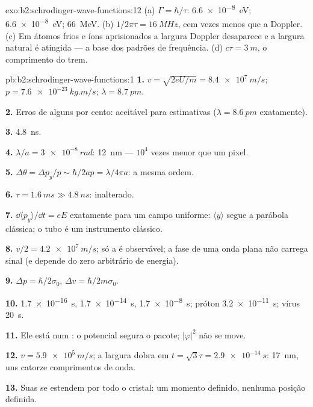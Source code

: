 \begin{solution}{exo:b2:schrodinger-wave-functions:12}
(a) $\Gamma = \hbar/\tau$: \qty{6.6e-8}{eV}; \qty{6.6e-8}{eV}; \qty{66}{MeV}. (b)
$1/2\pi\tau = \qty{16}{MHz}$, cem vezes menos que a Doppler. (c) Em
átomos frios e íons aprisionados a largura Doppler desaparece e a largura
natural é atingida --- a base dos padrões de frequência. (d) $c\tau =
\qty{3}{m}$, o comprimento do trem.
\end{solution}

\begin{solution}{pb:b2:schrodinger-wave-functions:1}
\textbf{1.} $v = \sqrt{2eU/m} = \qty{8.4e7}{m/s}$; $p = \qty{7.6e-23}{kg.m/s}$; $\lambda =
\qty{8.7}{pm}$.

\textbf{2.} Erros de alguns por cento: aceitável para estimativas ($\lambda =
\qty{8.6}{pm}$ exatamente).

\textbf{3.} \qty{4.8}{ns}.

\textbf{4.} $\lambda/a = \qty{3e-8}{rad}$: \qty{12}{nm} --- $10^4$ vezes menor que um
pixel.

\textbf{5.} $\Delta\theta = \Delta p_y/p \sim \hbar/2ap = \lambda/4\pi a$: a mesma ordem.

\textbf{6.} $\tau = \qty{1.6}{ms} \gg \qty{4.8}{ns}$: inalterado.

\textbf{7.} $\dd\langle p_y\rangle/\dd t = eE$ exatamente para um campo uniforme:
$\langle y\rangle$ segue a parábola clássica; o tubo é um
instrumento clássico.

\textbf{8.} $v/2 = \qty{4.2e7}{m/s}$; só a  é observável;
a fase de uma onda plana não carrega sinal (e depende do zero
arbitrário de energia).

\textbf{9.} $\Delta p = \hbar/2\sigma_0$, $\Delta v = \hbar/2m\sigma_0$.

\textbf{10.} \qty{1.7e-16}{s}, \qty{1.7e-14}{s}, \qty{1.7e-8}{s}; próton \qty{3.2e-11}{s};
vírus \qty{20}{s}.

\textbf{11.} Ele está num : o potencial segura o
pacote; $|\varphi|^2$ não se move.

\textbf{12.} $v = \qty{5.9e5}{m/s}$; a largura dobra em $t = \sqrt3\tau = \qty{2.9e-14}{s}$:
\qty{17}{nm}, uns catorze comprimentos de onda.

\textbf{13.} Suas  se estendem por todo o cristal: um
momento definido, nenhuma posição definida.


\end{solution}

